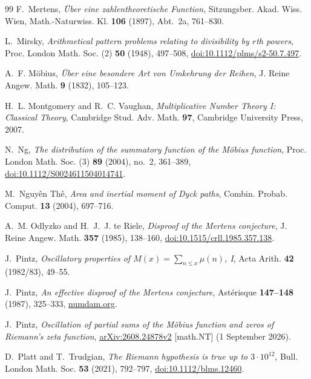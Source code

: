 \documentclass[11pt,reqno]{amsart}
\numberwithin{equation}{section}
\theoremstyle{plain}
\theoremstyle{definition}
\theoremstyle{remark}
\begin{document}
\begin{thebibliography}{99}
F.~Mertens, \emph{\"Uber eine zahlentheoretische Function}, Sitzungsber.
Akad. Wiss. Wien, Math.-Naturwiss. Kl. \textbf{106} (1897), Abt.~2a,
761--830.

L.~Mirsky, \emph{Arithmetical pattern problems relating to divisibility by $r$th powers}, Proc. London Math. Soc. (2) \textbf{50} (1948), 497--508,
\href{https://doi.org/10.1112/plms/s2-50.7.497}{doi:10.1112/plms/s2-50.7.497}.

A.~F. M\"obius, \emph{\"Uber eine besondere Art von Umkehrung der Reihen},
J. Reine Angew. Math. \textbf{9} (1832), 105--123.

H.~L. Montgomery and R.~C. Vaughan, \emph{Multiplicative Number Theory I:
Classical Theory}, Cambridge Stud. Adv. Math. \textbf{97}, Cambridge
University Press, 2007.

N.~Ng, \emph{The distribution of the summatory function of the M\"obius
function}, Proc. London Math. Soc. (3) \textbf{89} (2004), no.~2, 361--389,
\href{https://doi.org/10.1112/S0024611504014741}{doi:10.1112/S0024611504014741}.

M.~Nguy\^en Th\^e, \emph{Area and inertial moment of Dyck paths}, Combin.
Probab. Comput. \textbf{13} (2004), 697--716.

A.~M. Odlyzko and H.~J.~J. te Riele, \emph{Disproof of the Mertens
conjecture}, J. Reine Angew. Math. \textbf{357} (1985), 138--160,
\href{https://doi.org/10.1515/crll.1985.357.138}{doi:10.1515/crll.1985.357.138}.

J.~Pintz, \emph{Oscillatory properties of $M(x)=\sum_{n\le x}\mu(n)$, I},
Acta Arith. \textbf{42} (1982/83), 49--55.

J.~Pintz, \emph{An effective disproof of the Mertens conjecture}, Ast\'erisque
\textbf{147--148} (1987), 325--333,
\href{https://www.numdam.org/article/AST_1987__147-148__325_0.pdf}{numdam.org}.

J.~Pintz, \emph{Oscillation of partial sums of the M\"obius function and
zeros of Riemann's zeta function}, \href{https://arxiv.org/abs/2608.24878v2}{arXiv:2608.24878v2} [math.NT] (1 September 2026).

D.~Platt and T.~Trudgian, \emph{The Riemann hypothesis is true up to
$3\cdot10^{12}$}, Bull. London Math. Soc. \textbf{53} (2021), 792--797,
\href{https://doi.org/10.1112/blms.12460}{doi:10.1112/blms.12460}.


\end{thebibliography}
\end{document}
